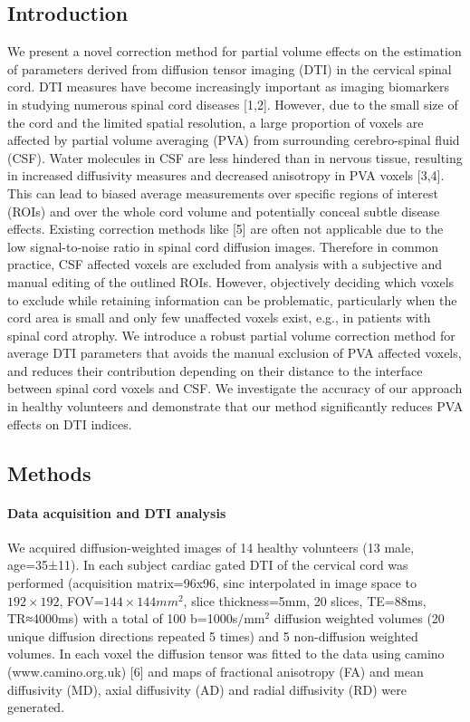 \subsection*{Introduction}
We present a novel correction method for partial volume effects on the estimation of parameters derived from diffusion tensor imaging (DTI) in the cervical spinal cord. DTI measures have become increasingly important as imaging biomarkers in studying numerous spinal cord diseases [1,2]. However, due to the small size of the cord and the limited spatial resolution, a large proportion of voxels are affected by partial volume averaging (PVA) from surrounding cerebro-spinal fluid (CSF). Water molecules in CSF are less hindered than in nervous tissue, resulting in increased diffusivity measures and decreased anisotropy in PVA voxels [3,4]. This can lead to biased average measurements over specific regions of interest (ROIs) and over the whole cord volume and potentially conceal subtle disease effects. Existing correction methods like [5] are often not applicable due to the low signal-to-noise ratio in spinal cord diffusion images. Therefore in common practice, CSF affected voxels are excluded from analysis with a subjective and manual editing of the outlined ROIs. However, objectively deciding which voxels to exclude while retaining information can be problematic, particularly when the cord area is small and only few unaffected voxels exist, e.g., in patients with spinal cord atrophy. We introduce a robust partial volume correction method for average DTI parameters that avoids the manual exclusion of PVA affected voxels, and reduces their contribution depending on their distance to the interface between spinal cord voxels and CSF. We investigate the accuracy of our approach in healthy volunteers and demonstrate that our method significantly reduces PVA effects on DTI indices.
\subsection*{Methods}
\paragraph{Data acquisition and DTI analysis}
We acquired diffusion-weighted images of 14 healthy volunteers (13 male, age=35±11). In each subject cardiac gated DTI of the cervical cord was performed (acquisition matrix=96x96, sinc interpolated in image space to $192\times 192$, FOV=$144\times 144mm^2$, slice thickness=5mm, 20 slices, TE=88ms, TR≈4000ms) with a total of 100 b=1000s/mm$^2$ diffusion weighted volumes (20 unique diffusion directions repeated 5 times) and 5 non-diffusion weighted volumes. In each voxel the diffusion tensor was fitted to the data using camino  (www.camino.org.uk) [6] and maps of fractional anisotropy (FA) and mean diffusivity (MD), axial diffusivity (AD) and radial diffusivity (RD) were generated. 
